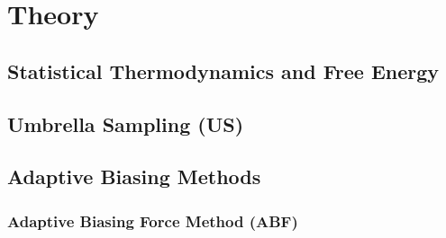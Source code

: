 \chapter{Theory}
\label{cha:theory}

\section{Statistical Thermodynamics and Free Energy}

\section{Umbrella Sampling (US)}
\label{sec:umbrella theory}

\section{Adaptive Biasing Methods}
\label{sec:adaptive biasing}

\subsection{Adaptive Biasing Force Method (ABF)}
\label{sec:ABF}


